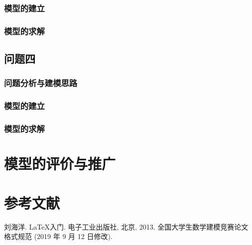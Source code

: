 \documentclass[withoutpreface,bwprint]{cumcmthesis} %
\begin{document}
	\subsubsection{模型的建立}


	\subsubsection{模型的求解}


\subsection{问题四}
	\subsubsection{问题分析与建模思路}


	\subsubsection{模型的建立}


	\subsubsection{模型的求解}

\section{模型的评价与推广}


\section{参考文献}

\begin{thebibliography}{9}%
    刘海洋.
    \newblock \LaTeX {}入门\allowbreak[J].
    \newblock 电子工业出版社, 北京, 2013.
    全国大学生数学建模竞赛论文格式规范 (2019 年 9 月 12 日修改).
\end{thebibliography}
\end{document}
